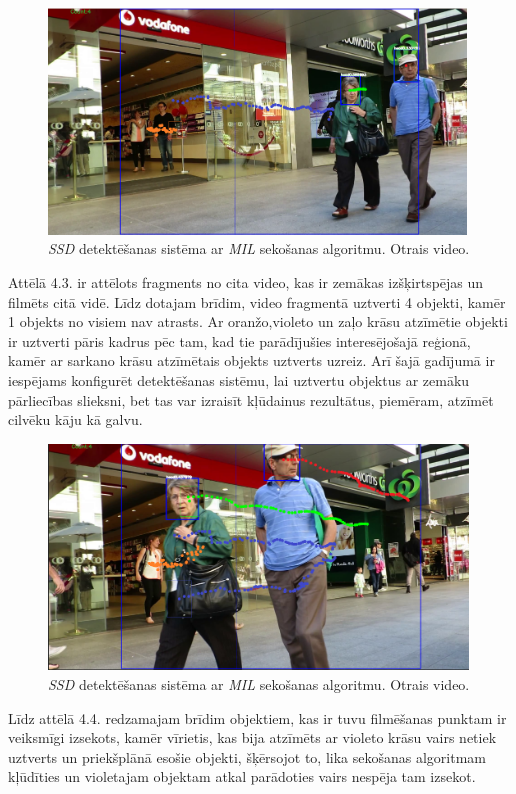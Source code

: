 \begin{figure}[h]%
	\centering
	\includegraphics[height=6cm]{images/ssd3.png} %
	\caption{\textit{SSD} detektēšanas sistēma ar \textit{MIL} sekošanas algoritmu. Otrais video.}%
	\label{fig:example}%
\end{figure}

Attēlā 4.3. ir attēlots fragments no cita video, kas ir zemākas izšķirtspējas un filmēts citā vidē. Līdz dotajam brīdim, video fragmentā uztverti 4 objekti, kamēr 1 objekts no visiem nav atrasts. Ar oranžo,violeto un zaļo krāsu atzīmētie objekti ir uztverti pāris kadrus pēc tam, kad tie parādījušies interesējošajā reģionā, kamēr ar sarkano krāsu atzīmētais objekts uztverts uzreiz. Arī šajā gadījumā ir iespējams konfigurēt detektēšanas sistēmu, lai uztvertu objektus ar zemāku pārliecības slieksni, bet tas var izraisīt kļūdainus rezultātus, piemēram, atzīmēt cilvēku kāju kā galvu.

\begin{figure}[h]%
	\centering
	\includegraphics[height=6cm]{images/ssd4.png} %
	\caption{\textit{SSD} detektēšanas sistēma ar \textit{MIL} sekošanas algoritmu. Otrais video.}%
	\label{fig:example}%
\end{figure}

Līdz attēlā 4.4. redzamajam brīdim objektiem, kas ir tuvu filmēšanas punktam ir veiksmīgi izsekots, kamēr vīrietis, kas bija atzīmēts ar violeto krāsu vairs netiek uztverts un priekšplānā esošie objekti, šķērsojot to, lika sekošanas algoritmam kļūdīties un violetajam objektam atkal parādoties vairs nespēja tam izsekot. 

